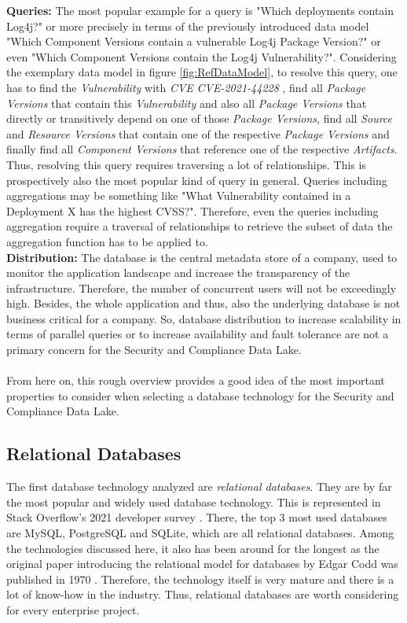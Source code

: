 \textbf{Queries:} The most popular example for a query is "Which deployments contain Log4j?" or more precisely in terms of the previously introduced data model "Which Component Versions contain a vulnerable Log4j Package Version?" or even "Which Component Versions contain the Log4j Vulnerability?". Considering the exemplary data model in figure \ref{fig:RefDataModel}, to resolve this query, one has to find the \emph{Vulnerability} with \emph{CVE} \textit{CVE-2021-44228} \cite{Log4jVuln}, find all \emph{Package Versions} that contain this \emph{Vulnerability} and also all \emph{Package Versions} that directly or transitively depend on one of those \emph{Package Versions}, find all \emph{Source} and \emph{Resource Versions} that contain one of the respective \emph{Package Versions} and finally find all \emph{Component Versions} that reference one of the respective \emph{Artifacts}. Thus, resolving this query requires traversing a lot of relationships. This is prospectively also the most popular kind of query in general. Queries including aggregations may be something like "What Vulnerability contained in a Deployment X has the highest CVSS?". Therefore, even the queries including aggregation require a traversal of relationships to retrieve the subset of data the aggregation function has to be applied to.\\
\textbf{Distribution:} The database is the central metadata store of a company, used to monitor the application landscape and increase the transparency of the infrastructure. Therefore, the number of concurrent users will not be exceedingly high. Besides, the whole application and thus, also the underlying database is not business critical for a company. So, database distribution to increase scalability in terms of parallel queries or to increase availability and fault tolerance are not a primary concern for the Security and Compliance Data Lake.\\\\
From here on, this rough overview provides a good idea of the most important properties to consider when selecting a database technology for the Security and Compliance Data Lake. 


\subsection{Relational Databases}
The first database technology analyzed are \textit{relational databases}. They are by far the most popular and widely used database technology. This is represented in Stack Overflow's 2021 developer survey \cite{StackoverflowDeveloperSurvey}. There, the top 3 most used databases are MySQL, PostgreSQL and SQLite, which are all relational databases. Among the technologies discussed here, it also has been around for the longest as the original paper introducing the relational model for databases by Edgar Codd was published in 1970 \cite{RelationalDatabaseOriginalPaper}. Therefore, the technology itself is very mature and there is a lot of know-how in the industry. Thus, relational databases are worth considering for every enterprise project.

